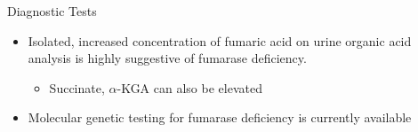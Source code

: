 \documentclass[presentation, smaller]{beamer}
\begin{document}
\begin{frame}[label={sec:org9040738}]{Diagnostic Tests}
\begin{itemize}
\item Isolated, increased concentration of fumaric acid on urine organic
acid analysis is highly suggestive of fumarase deficiency.
\begin{itemize}
\item Succinate, \(\alpha\)-KGA can also be elevated
\end{itemize}
\item Molecular genetic testing for fumarase deficiency is currently available
\end{itemize}
\end{frame}
\end{document}
